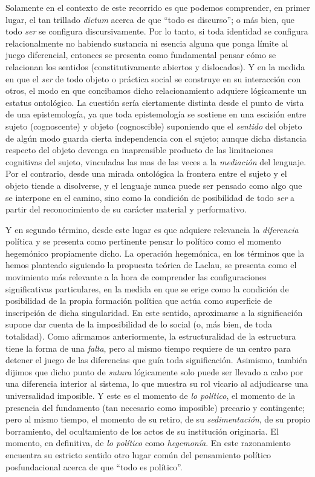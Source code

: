 \documentclass{book}
\begin{document}
Solamente en el contexto de este recorrido es que podemos comprender, en
primer lugar, el tan trillado \emph{dictum} acerca de que ``todo es
discurso''; o más bien, que todo \emph{ser} se configura
discursivamente. Por lo tanto, si toda identidad se configura
relacionalmente no habiendo sustancia ni esencia alguna que ponga límite
al juego diferencial, entonces se presenta como fundamental pensar cómo
se relacionan los sentidos (constitutivamente abiertos y dislocados). Y
en la medida en que el \emph{ser} de todo objeto o práctica social se
construye en su interacción con otros, el modo en que concibamos dicho
relacionamiento adquiere lógicamente un estatus ontológico. La cuestión
sería ciertamente distinta desde el punto de vista de una epistemología,
ya que toda epistemología se sostiene en una escisión entre sujeto
(cognoscente) y objeto (cognoscible) suponiendo que el \emph{sentido}
del objeto de algún modo guarda cierta independencia con el sujeto;
aunque dicha distancia respecto del objeto devenga en inaprensible
producto de las limitaciones cognitivas del sujeto, vinculadas las mas
de las veces a la \emph{mediación} del lenguaje. Por el contrario, desde
una mirada ontológica la frontera entre el sujeto y el objeto tiende a
disolverse, y el lenguaje nunca puede ser pensado como algo que se
interpone en el camino, sino como la condición de posibilidad de todo
\emph{ser} a partir del reconocimiento de su carácter material y
performativo.

Y en segundo término, desde este lugar es que adquiere relevancia la
\emph{diferencia} política y se presenta como pertinente pensar lo
político como el momento hegemónico propiamente dicho. La operación
hegemónica, en los términos que la hemos planteado siguiendo la
propuesta teórica de Laclau, se presenta como el movimiento más
relevante a la hora de comprender las configuraciones significativas
particulares, en la medida en que se erige como la condición de
posibilidad de la propia formación política que actúa como superficie de
inscripción de dicha singularidad. En este sentido, aproximarse a la
significación supone dar cuenta de la imposibilidad de lo social (o, más
bien, de toda totalidad). Como afirmamos anteriormente, la
estructuralidad de la estructura tiene la forma de una \emph{falta},
pero al mismo tiempo requiere de un centro para detener el juego de las
diferencias que guía toda significación. Asimismo, también dijimos que
dicho punto de \emph{sutura} lógicamente solo puede ser llevado a cabo
por una diferencia interior al sistema, lo que muestra su rol vicario al
adjudicarse una universalidad imposible. Y este es el momento de
\emph{lo político}, el momento de la presencia del fundamento (tan
necesario como imposible) precario y contingente; pero al mismo tiempo,
el momento de su retiro, de su \emph{sedimentación}, de su propio
borramiento, del ocultamiento de los actos de su institución originaria.
El momento, en definitiva, de \emph{lo político} como \emph{hegemonía}.
En este razonamiento encuentra su estricto sentido otro lugar común del
pensamiento político posfundacional acerca de que ``todo es político''.
\end{document}
